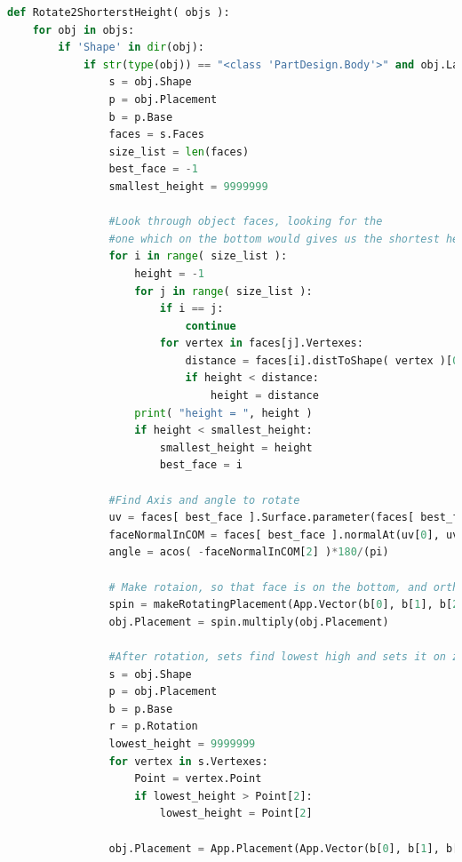 \begin{lstlisting}[language=Python, breaklines, caption = \textit{Rotate2ShorterstHeight}, captionpos=b]
def Rotate2ShorterstHeight( objs ):
    for obj in objs:
        if 'Shape' in dir(obj):
            if str(type(obj)) == "<class 'PartDesign.Body'>" and obj.Label != "Board Body":
                s = obj.Shape
                p = obj.Placement
                b = p.Base
                faces = s.Faces
                size_list = len(faces)
                best_face = -1
                smallest_height = 9999999

                #Look through object faces, looking for the 
                #one which on the bottom would gives us the shortest height
                for i in range( size_list ):
                    height = -1
                    for j in range( size_list ):
                        if i == j:
                            continue
                        for vertex in faces[j].Vertexes:
                            distance = faces[i].distToShape( vertex )[0]
                            if height < distance:
                                height = distance
                    print( "height = ", height )
                    if height < smallest_height:
                        smallest_height = height
                        best_face = i

                #Find Axis and angle to rotate
                uv = faces[ best_face ].Surface.parameter(faces[ best_face ].CenterOfMass)
                faceNormalInCOM = faces[ best_face ].normalAt(uv[0], uv[1])
                angle = acos( -faceNormalInCOM[2] )*180/(pi)

                # Make rotaion, so that face is on the bottom, and orthogonal to XY
                spin = makeRotatingPlacement(App.Vector(b[0], b[1], b[2]), App.Vector(-faceNormalInCOM[1], faceNormalInCOM[0], 0), angle)
                obj.Placement = spin.multiply(obj.Placement)

                #After rotation, sets find lowest high and sets it on zero
                s = obj.Shape
                p = obj.Placement
                b = p.Base
                r = p.Rotation
                lowest_height = 9999999
                for vertex in s.Vertexes:
                    Point = vertex.Point
                    if lowest_height > Point[2]:
                        lowest_height = Point[2]

                obj.Placement = App.Placement(App.Vector(b[0], b[1], b[2] - lowest_height), r)
\end{lstlisting}

